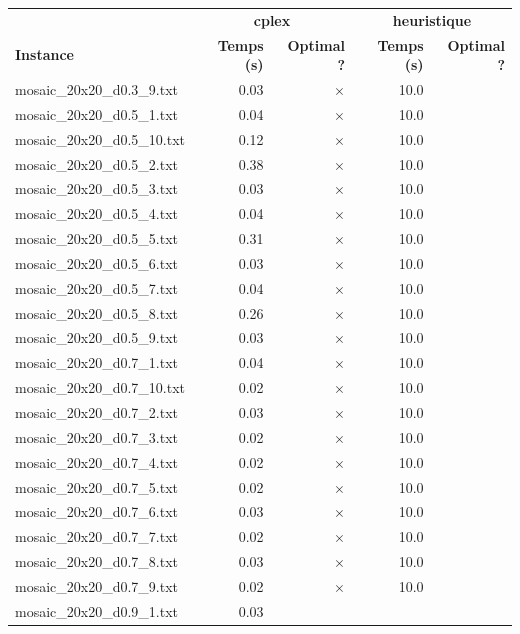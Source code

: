 \documentclass{article}
\begin{document}
\newpage
\begin{center}
\renewcommand{\arraystretch}{1.4} 
 \begin{tabular}{lrrrr}
	\hline
 & \multicolumn{2}{c}{\textbf{cplex}} & \multicolumn{2}{c}{\textbf{heuristique}}\\
\textbf{Instance}  & \textbf{Temps (s)} & \textbf{Optimal ?}  & \textbf{Temps (s)} & \textbf{Optimal ?} \\\hline

mosaic\_20x20\_d0.3\_9.txt & 0.03 & 
$\times$
 & 10.0 & 
\\
mosaic\_20x20\_d0.5\_1.txt & 0.04 & 
$\times$
 & 10.0 & 
\\
mosaic\_20x20\_d0.5\_10.txt & 0.12 & 
$\times$
 & 10.0 & 
\\
mosaic\_20x20\_d0.5\_2.txt & 0.38 & 
$\times$
 & 10.0 & 
\\
mosaic\_20x20\_d0.5\_3.txt & 0.03 & 
$\times$
 & 10.0 & 
\\
mosaic\_20x20\_d0.5\_4.txt & 0.04 & 
$\times$
 & 10.0 & 
\\
mosaic\_20x20\_d0.5\_5.txt & 0.31 & 
$\times$
 & 10.0 & 
\\
mosaic\_20x20\_d0.5\_6.txt & 0.03 & 
$\times$
 & 10.0 & 
\\
mosaic\_20x20\_d0.5\_7.txt & 0.04 & 
$\times$
 & 10.0 & 
\\
mosaic\_20x20\_d0.5\_8.txt & 0.26 & 
$\times$
 & 10.0 & 
\\
mosaic\_20x20\_d0.5\_9.txt & 0.03 & 
$\times$
 & 10.0 & 
\\
mosaic\_20x20\_d0.7\_1.txt & 0.04 & 
$\times$
 & 10.0 & 
\\
mosaic\_20x20\_d0.7\_10.txt & 0.02 & 
$\times$
 & 10.0 & 
\\
mosaic\_20x20\_d0.7\_2.txt & 0.03 & 
$\times$
 & 10.0 & 
\\
mosaic\_20x20\_d0.7\_3.txt & 0.02 & 
$\times$
 & 10.0 & 
\\
mosaic\_20x20\_d0.7\_4.txt & 0.02 & 
$\times$
 & 10.0 & 
\\
mosaic\_20x20\_d0.7\_5.txt & 0.02 & 
$\times$
 & 10.0 & 
\\
mosaic\_20x20\_d0.7\_6.txt & 0.03 & 
$\times$
 & 10.0 & 
\\
mosaic\_20x20\_d0.7\_7.txt & 0.02 & 
$\times$
 & 10.0 & 
\\
mosaic\_20x20\_d0.7\_8.txt & 0.03 & 
$\times$
 & 10.0 & 
\\
mosaic\_20x20\_d0.7\_9.txt & 0.02 & 
$\times$
 & 10.0 & 
\\
mosaic\_20x20\_d0.9\_1.txt & 0.03 & 

\end{tabular}
\end{center}
\end{document}

